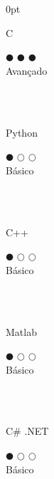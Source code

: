 \documentclass[a4paper]{article}
\begin{document}
\begin{adjustwidth}{\parindent}{0pt}
\begin{minipage}[t]{0.25\textwidth}
 \begin{minipage}{0.65\textwidth}
   \small{C}
 \end{minipage}
 \begin{minipage}{0.3\textwidth}
   \centering $\mdlgblkcircle$ $\mdlgblkcircle$ $\mdlgblkcircle$ \\  \footnotesize{Avançado}
 \end{minipage} \\ \hspace{0pt} \\
 
  \begin{minipage}{0.65\textwidth}
   \small{Python}
 \end{minipage}
 \begin{minipage}{0.3\textwidth}
   \centering $\mdlgblkcircle$ $\mdlgwhtcircle$ $\mdlgwhtcircle$ \\  \footnotesize{Básico}
 \end{minipage} \\ \hspace{0pt} \\
 
 \begin{minipage}{0.65\textwidth}
   \small{C++}
 \end{minipage}
 \begin{minipage}{0.3\textwidth}
   \centering $\mdlgblkcircle$ $\mdlgwhtcircle$ $\mdlgwhtcircle$ \\  \footnotesize{Básico}
 \end{minipage} \\ \hspace{0pt} \\
 
 \begin{minipage}{0.65\textwidth}
   \small{Matlab}
 \end{minipage}
 \begin{minipage}{0.3\textwidth}
   \centering $\mdlgblkcircle$ $\mdlgwhtcircle$ $\mdlgwhtcircle$ \\  \footnotesize{Básico}
 \end{minipage} \\ \hspace{0pt} \\
 
  \begin{minipage}{0.65\textwidth}
   \small{C\# .NET}
 \end{minipage}
 \begin{minipage}{0.3\textwidth}
   \centering $\mdlgblkcircle$ $\mdlgwhtcircle$ $\mdlgwhtcircle$ \\  \footnotesize{Básico}
 \end{minipage} \\ \hspace{0pt} \\


\end{minipage}
\end{adjustwidth}
\end{document}
